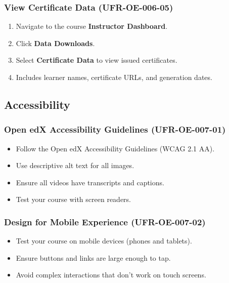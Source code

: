 \subsubsection{View Certificate Data (UFR-OE-006-05)}
\begin{enumerate}
    \item Navigate to the course \textbf{Instructor Dashboard}.
    \item Click \textbf{Data Downloads}.
    \item Select \textbf{Certificate Data} to view issued certificates.
    \item Includes learner names, certificate URLs, and generation dates.
\end{enumerate}

\subsection{Accessibility}

\subsubsection{Open edX Accessibility Guidelines (UFR-OE-007-01)}
\begin{itemize}
    \item Follow the Open edX Accessibility Guidelines (WCAG 2.1 AA).
    \item Use descriptive alt text for all images.
    \item Ensure all videos have transcripts and captions.
    \item Test your course with screen readers.
\end{itemize}

\subsubsection{Design for Mobile Experience (UFR-OE-007-02)}
\begin{itemize}
    \item Test your course on mobile devices (phones and tablets).
    \item Ensure buttons and links are large enough to tap.
    \item Avoid complex interactions that don't work on touch screens.
\end{itemize}

